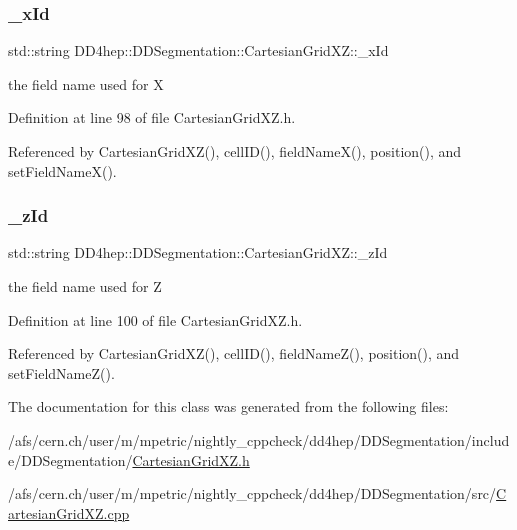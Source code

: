 \subsubsection{\texorpdfstring{\+\_\+x\+Id}{\_xId}}
{\footnotesize\ttfamily std\+::string D\+D4hep\+::\+D\+D\+Segmentation\+::\+Cartesian\+Grid\+X\+Z\+::\+\_\+x\+Id\hspace{0.3cm}{\ttfamily [protected]}}



the field name used for X 



Definition at line 98 of file Cartesian\+Grid\+X\+Z.\+h.



Referenced by Cartesian\+Grid\+X\+Z(), cell\+I\+D(), field\+Name\+X(), position(), and set\+Field\+Name\+X().

\hypertarget{class_d_d4hep_1_1_d_d_segmentation_1_1_cartesian_grid_x_z_aa90fc4531dd5884afcc2c6c2a824ce18}{}\label{class_d_d4hep_1_1_d_d_segmentation_1_1_cartesian_grid_x_z_aa90fc4531dd5884afcc2c6c2a824ce18} 
\subsubsection{\texorpdfstring{\+\_\+z\+Id}{\_zId}}
{\footnotesize\ttfamily std\+::string D\+D4hep\+::\+D\+D\+Segmentation\+::\+Cartesian\+Grid\+X\+Z\+::\+\_\+z\+Id\hspace{0.3cm}{\ttfamily [protected]}}



the field name used for Z 



Definition at line 100 of file Cartesian\+Grid\+X\+Z.\+h.



Referenced by Cartesian\+Grid\+X\+Z(), cell\+I\+D(), field\+Name\+Z(), position(), and set\+Field\+Name\+Z().



The documentation for this class was generated from the following files\+:\begin{DoxyCompactItemize}
\item 
/afs/cern.\+ch/user/m/mpetric/nightly\+\_\+cppcheck/dd4hep/\+D\+D\+Segmentation/include/\+D\+D\+Segmentation/\hyperlink{_d_d_segmentation_2include_2_d_d_segmentation_2_cartesian_grid_x_z_8h}{Cartesian\+Grid\+X\+Z.\+h}\item 
/afs/cern.\+ch/user/m/mpetric/nightly\+\_\+cppcheck/dd4hep/\+D\+D\+Segmentation/src/\hyperlink{_d_d_segmentation_2src_2_cartesian_grid_x_z_8cpp}{Cartesian\+Grid\+X\+Z.\+cpp}\end{DoxyCompactItemize}

